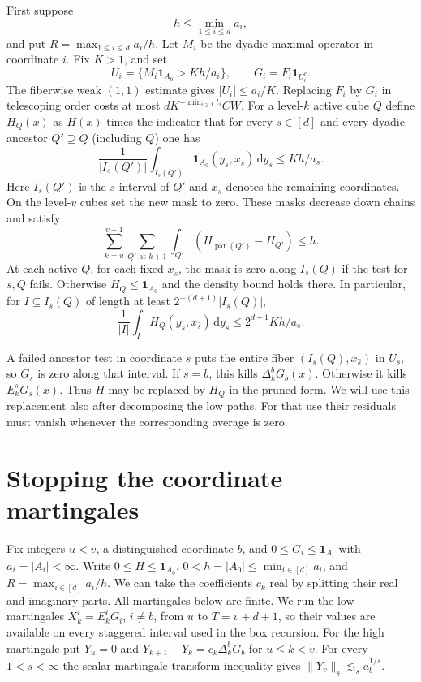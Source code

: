 \documentclass[11pt]{article}
\newcommand{\ind}{\mathbf 1}
\newcommand{\dd}{\,\mathrm d}
\newcommand{\anorm}[1]{\lVert #1\rVert}
\begin{document}
First suppose
\begin{equation}\label{eq:smalltest}
             h\le \min_{1\le i\le d}a_i ,
\end{equation}
and put \(R=\max_{1\le i\le d}a_i/h\).
Let \(M_i\) be the dyadic maximal operator in coordinate \(i\).
Fix \(K>1\), and set
\[
   U_i=\{M_i\ind_{A_0}>K h/a_i\},\qquad G_i=F_i\ind_{U_i^c}.
\]
The fiberwise weak \((1,1)\) estimate gives \(|U_i|\le a_i/K\).
Replacing \(F_i\) by \(G_i\) in telescoping order costs at most
\(d K^{-\min_{i\ge1}t_i}CW\). For a level-\(k\) active cube \(Q\)
define \(H_Q(x)\) as \(H(x)\) times the indicator that for every
\(s\in[d]\) and every dyadic ancestor \(Q'\supseteq Q\)
(including \(Q\)) one has
\[
       \frac1{|I_s(Q')|}\int_{I_s(Q')}\ind_{A_0}(y_s,x_{\hat s})
                                    \dd y_s\le K h/a_s .
\]
Here \(I_s(Q')\) is the \(s\)-interval of \(Q'\) and \(x_{\hat s}\)
denotes the remaining coordinates. On the level-\(v\) cubes set the
new mask to zero. These masks decrease down chains and satisfy
\begin{equation}\label{eq:drop}
   \sum_{k=u}^{v-1}\sum_{Q'\text{ at }k+1}
       \int_{Q'}(H_{\operatorname{par}(Q')}-H_{Q'})\le h .
\end{equation}
At each active \(Q\), for each fixed \(x_{\hat s}\), the mask is zero
along \(I_s(Q)\) if the test for \(s,Q\) fails. Otherwise \(H_Q\le
\ind_{A_0}\) and the density bound holds there. In particular,
for \(I\subseteq I_s(Q)\) of length at least \(2^{-(d+1)}|I_s(Q)|\),
\begin{equation}\label{eq:fiber}
          \frac1{|I|}\int_I H_Q(y_s,x_{\hat s})\dd y_s
                                      \le 2^{d+1}K h/a_s .
\end{equation}

A failed ancestor test in coordinate \(s\) puts the entire fiber
\((I_s(Q),x_{\hat s})\) in \(U_s\), so \(G_s\) is zero along that
interval. If \(s=b\), this kills \(\Delta_k^bG_b(x)\). Otherwise it
kills \(E_k^sG_s(x)\). Thus \(H\) may be replaced by \(H_Q\) in the
pruned form. We will use this replacement also after decomposing the
low paths. For that use their residuals must vanish whenever the
corresponding average is zero.


\section{Stopping the coordinate martingales}\label{sec:stopping}

Fix integers \(u<v\), a distinguished coordinate \(b\), and
\(0\le G_i\le\ind_{A_i}\) with \(a_i=|A_i|<\infty\). Write
\(0\le H\le\ind_{A_0}\), \(0<h=|A_0|\le\min_{i\in[d]}a_i\), and
\(R=\max_{i\in[d]}a_i/h\). We can take the coefficients \(c_k\) real
by splitting their real and imaginary parts. All martingales below are
finite. We run the low martingales \(X^i_k=E^i_kG_i\), \(i\ne b\),
from \(u\) to \(T=v+d+1\), so their values are available on every
staggered interval used in the box recursion. For the high martingale
put \(Y_u=0\) and \(Y_{k+1}-Y_k=c_k\Delta^b_kG_b\) for \(u\le k<v\).
For every \(1<s<\infty\) the scalar martingale transform inequality \cite{Burkholder} gives
\(\anorm{Y_v}_s\lesssim_s a_b^{1/s}\).
\end{document}
